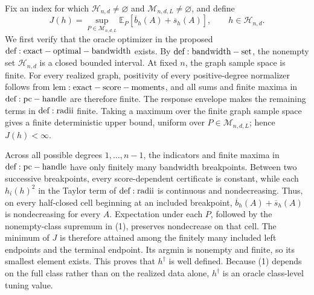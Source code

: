 Fix an index for which \(\mathcal H_{n,d}\ne\varnothing\) and \(\mathcal M_{n,d,L}\ne\varnothing\), and define
\[
 J(h)=\sup_{P\in\mathcal M_{n,d,L}}
 \mathbb E_P[\overline b_h(A)+\overline s_h(A)],
 \qquad h\in\mathcal H_{n,d}.
\tag{1}
\]
We first verify that the oracle optimizer in the proposed \({\rm def:exact-optimal-bandwidth}\) exists.  By \({\rm def:bandwidth-set}\), the nonempty set \(\mathcal H_{n,d}\) is a closed bounded interval.  At fixed \(n\), the graph sample space is finite.  For every realized graph, positivity of every positive-degree normalizer follows from \({\rm lem:exact-score-moments}\), and all sums and finite maxima in \({\rm def:pc-handle}\) are therefore finite.  The response envelope makes the remaining terms in \({\rm def:radii}\) finite.  Taking a maximum over the finite graph sample space gives a finite deterministic upper bound, uniform over \(P\in\mathcal M_{n,d,L}\); hence \(J(h)<\infty\).

Across all possible degrees \(1,\ldots,n-1\), the indicators and finite maxima in \({\rm def:pc-handle}\) have only finitely many bandwidth breakpoints.  Between two successive breakpoints, every score-dependent certificate is constant, while each \(h_i(h)^2\) in the Taylor term of \({\rm def:radii}\) is continuous and nondecreasing.  Thus, on every half-closed cell beginning at an included breakpoint, \(\overline b_h(A)+\overline s_h(A)\) is nondecreasing for every \(A\).  Expectation under each \(P\), followed by the nonempty-class supremum in (1), preserves nondecrease on that cell.  The minimum of \(J\) is therefore attained among the finitely many included left endpoints and the terminal endpoint.  Its argmin is nonempty and finite, so its smallest element exists.  This proves that \(h^\dagger\) is well defined.  Because (1) depends on the full class rather than on the realized data alone, \(h^\dagger\) is an oracle class-level tuning value.

